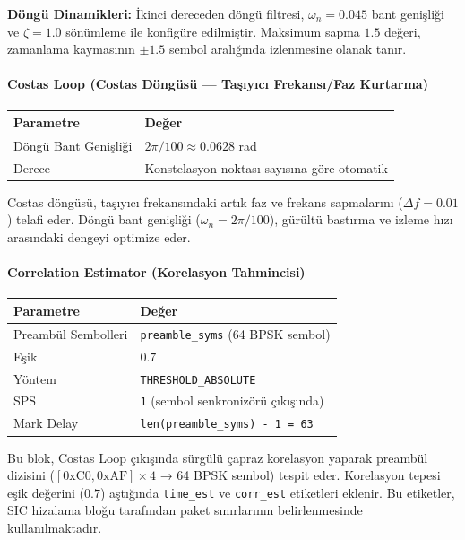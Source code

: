 \documentclass[
]{IEEEtran}
\newcounter{none} %
\begin{document}
\textbf{Döngü Dinamikleri:} İkinci dereceden döngü filtresi,
\(\omega_n = 0.045\) bant genişliği ve \(\zeta = 1.0\) sönümleme ile
konfigüre edilmiştir. Maksimum sapma \(1.5\) değeri, zamanlama
kaymasının \(\pm 1.5\) sembol aralığında izlenmesine olanak tanır.

\paragraph{Costas Loop (Costas Döngüsü --- Taşıyıcı Frekansı/Faz
Kurtarma)}\label{costas-loop-costas-duxf6nguxfcsuxfc-taux15fux131yux131cux131-frekansux131faz-kurtarma}

{\def\LTcaptype{none} %
\begin{longtable}[]{@{}ll@{}}
\toprule\noalign{}
Parametre & Değer \\
\midrule\noalign{}
\endhead
\bottomrule\noalign{}
\endlastfoot
Döngü Bant Genişliği & \(2\pi / 100 \approx 0.0628\) rad \\
Derece & Konstelasyon noktası sayısına göre otomatik \\
\end{longtable}
}

Costas döngüsü, taşıyıcı frekansındaki artık faz ve frekans sapmalarını
(\(\Delta f = 0.01\)) telafi eder. Döngü bant genişliği
(\(\omega_n = 2\pi/100\)), gürültü bastırma ve izleme hızı arasındaki
dengeyi optimize eder.

\paragraph{Correlation Estimator (Korelasyon
Tahmincisi)}\label{correlation-estimator-korelasyon-tahmincisi}

{\def\LTcaptype{none} %
\begin{longtable}[]{@{}ll@{}}
\toprule\noalign{}
Parametre & Değer \\
\midrule\noalign{}
\endhead
\bottomrule\noalign{}
\endlastfoot
Preambül Sembolleri & \texttt{preamble\_syms} (64 BPSK sembol) \\
Eşik & \(0.7\) \\
Yöntem & \texttt{THRESHOLD\_ABSOLUTE} \\
SPS & \texttt{1} (sembol senkronizörü çıkışında) \\
Mark Delay & \texttt{len(preamble\_syms)\ -\ 1\ =\ 63} \\
\end{longtable}
}

Bu blok, Costas Loop çıkışında sürgülü çapraz korelasyon yaparak
preambül dizisini (\([0\text{xC0}, 0\text{xAF}] \times 4\) → 64 BPSK
sembol) tespit eder. Korelasyon tepesi eşik değerini (\(0.7\)) aştığında
\texttt{time\_est} ve \texttt{corr\_est} etiketleri eklenir. Bu
etiketler, SIC hizalama bloğu tarafından paket sınırlarının
belirlenmesinde kullanılmaktadır.
\end{document}
